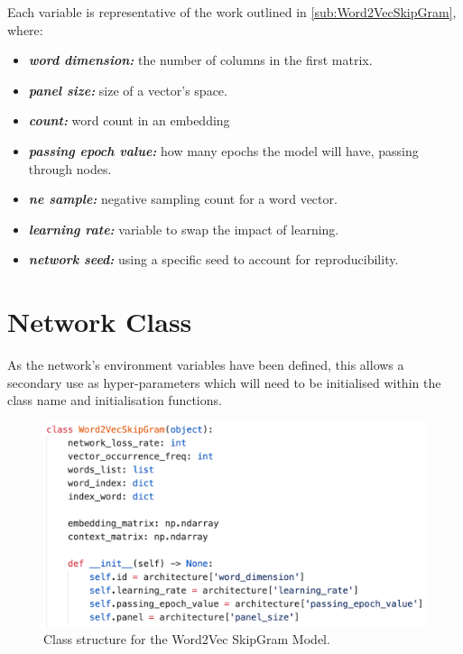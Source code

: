 Each variable is representative of the work outlined in \autoref{sub:Word2VecSkipGram}, where:

\begin{itemize}
    \item \textbf{\textit{word dimension:}} the number of columns in the first matrix.
    \item \textbf{\textit{panel size:}} size of a vector's space.
    \item \textbf{\textit{count:}} word count in an embedding
    \item \textbf{\textit{passing epoch value:}} how many epochs the model will have, passing through nodes.
    \item \textbf{\textit{ne sample:}} negative sampling count for a word vector.
    \item \textbf{\textit{learning rate:}} variable to swap the impact of learning.
    \item \textbf{\textit{network seed:}} using a specific seed to account for reproducibility.
\end{itemize}

\section{Network Class}

As the network's environment variables have been defined, this allows a secondary use as hyper-parameters which will need to be initialised within the class name and initialisation functions.

\begin{figure}[H]
    \centering
    \includegraphics[width=\textwidth]{figures/chapter-6/word2vecclass.png}
    \caption[Class structure for the Word2Vec SkipGram Model]{Class structure for the Word2Vec SkipGram Model.
    \label{fig:word2vec_class}}
\end{figure}

